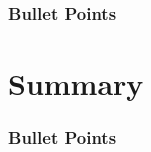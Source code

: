 \documentclass{beamer}
\begin{document}

\begin{frame}
\frametitle{Bullet Points}

\end{frame}



\section{Summary} 


\begin{frame}
\frametitle{Bullet Points}

\end{frame}

\end{document}
